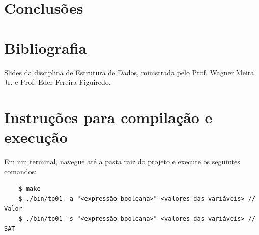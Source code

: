 \documentclass{article}
\begin{document}
\section{Conclusões}

\section*{Bibliografia}

Slides da disciplina de Estrutura de Dados, ministrada pelo Prof. Wagner Meira Jr. e Prof. Eder Fereira Figuiredo.


\section*{Instruções para compilação e execução}

Em um terminal, navegue até a pasta raiz do projeto e execute os seguintes comandos:

\begin{verbatim}
    $ make
    $ ./bin/tp01 -a "<expressão booleana>" <valores das variáveis> // Valor 
    $ ./bin/tp01 -s "<expressão booleana>" <valores das variáveis> // SAT
\end{verbatim}
\end{document}
